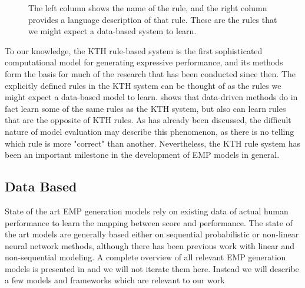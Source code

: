 \begin{figure}
    \centering
    \caption{The left column shows the name of the rule, and the right column provides a language description of that rule. These are the rules that we might expect a data-based system to learn.}
    \label{fig:kth-rules}
\end{figure}

To our knowledge, the KTH rule-based system is the first sophisticated computational model for generating expressive performance, and its methods form the basis for much of the research that has been conducted since then. The explicitly defined rules in the KTH system can be thought of as the rules we might expect a data-based model to learn. \citet{widmer2002machine} shows that data-driven methods do in fact learn some of the same rules as the KTH system, but also can learn rules that are the opposite of KTH rules. As has already been discussed, the difficult nature of model evaluation may describe this phenomenon, as there is no telling which rule is more "correct" than another. Nevertheless, the KTH rule system has been an important milestone in the development of EMP models in general. 

\subsection{Data Based}
State of the art EMP generation models rely on existing data of actual human performance to learn the mapping between score and performance. The state of the art models are generally based either on sequential probabilistic or non-linear neural network methods\cite{cancino2018computational}, although there has been previous work with linear and non-sequential modeling. A complete overview of all relevant EMP generation models is presented in \cite{cancino2018computational} and we will not iterate them here. Instead we will describe a few models and frameworks which are relevant to our work

